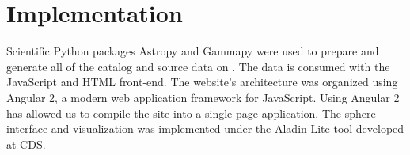 \section{Implementation}

Scientific Python packages Astropy \cite{astropy} and Gammapy were used to prepare and generate all of the catalog and source data on \gammasky. The data is consumed with the JavaScript and HTML front-end. The website's architecture was organized using Angular 2, a modern web application framework for JavaScript. Using Angular 2 has allowed us to compile the site into a single-page application. The sphere interface and visualization was implemented under the Aladin Lite tool \cite{aladin-lite} developed at CDS.
